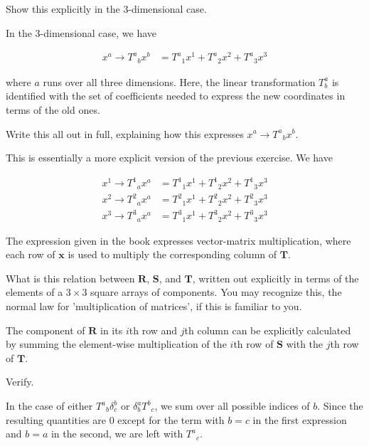 \documentclass[../the-road-to-reality.tex]{subfiles}
\begin{document}
\begin{questions}
\question Show this explicitly in the $3$-dimensional case.

\begin{solution}
        In the $3$-dimensional case, we have

        \begin{align*}
                x^a \to {T^a}_bx^b &= {T^a}_1x^1 + {T^a}_2x^2 + {T^a}_3x^3
        \end{align*}

        where $a$ runs over all three dimensions. Here, the linear transformation $T^a_b$ is identified with the set of coefficients needed to express the new coordinates in terms of the old ones.
\end{solution}

\question Write this all out in full, explaining how this expresses $x^a\to{T^a}_bx^b$.

\begin{solution}
        This is essentially a more explicit version of the previous exercise. We have

        \begin{align*}
                x^1 \to {T^1}_ax^a &= {T^1}_1x^1 + {T^1}_2x^2 + {T^1}_3x^3 \\
                x^2 \to {T^2}_ax^a &= {T^2}_1x^1 + {T^2}_2x^2 + {T^2}_3x^3 \\
                x^3 \to {T^3}_ax^a &= {T^3}_1x^1 + {T^3}_2x^2 + {T^3}_3x^3
        \end{align*}

        The expression given in the book expresses vector-matrix multiplication, where each row of $\mathbf{x}$ is used to multiply the corresponding column of $\mathbf{T}$.
\end{solution}

\question What is this relation between $\mathbf{R}$, $\mathbf{S}$, and $\mathbf{T}$, written out explicitly in terms of the elements of a $3\times{3}$ square arrays of components. You may recognize this, the normal law for 'multiplication of matrices', if this is familiar to you.

\begin{solution}
        The component of $\mathbf{R}$ in its $i$th row and $j$th column can be explicitly calculated by summing the element-wise multiplication of the $i$th row of $\mathbf{S}$ with the $j$th row of $\mathbf{T}$.
\end{solution}

\question Verify.

\begin{solution}
        In the case of either ${T^a}_b\delta^b_c$ or $\delta^a_b{T^b}_c$, we sum over all possible indices of $b$. Since the resulting quantities are $0$ except for the term with $b=c$ in the first expression and $b=a$ in the second, we are left with ${T^a}_c$.
\end{solution}


\end{questions}
\end{document}
